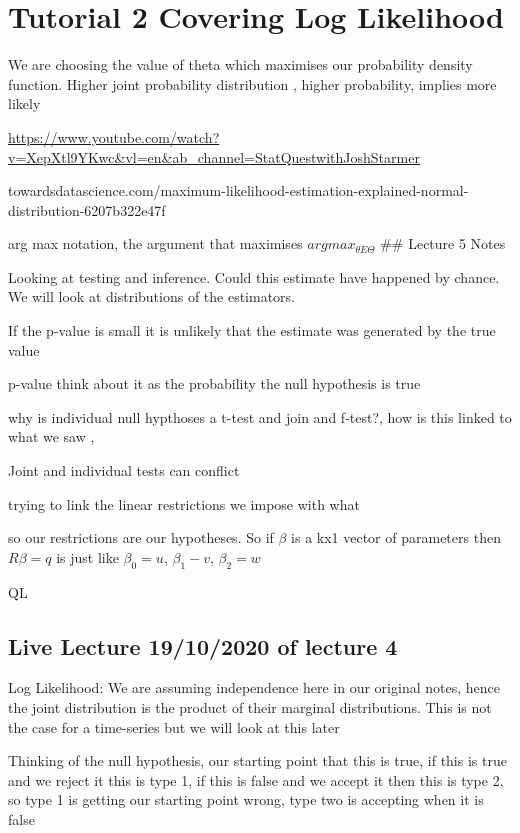 \documentclass[]{article}
\begin{document}
\section{Tutorial 2 Covering Log
Likelihood}\label{tutorial-2-covering-log-likelihood}

We are choosing the value of theta which maximises our probability
density function. Higher joint probability distribution , higher
probability, implies more likely

\url{https://www.youtube.com/watch?v=XepXtl9YKwc\&vl=en\&ab_channel=StatQuestwithJoshStarmer}

towardsdatascience.com/maximum-likelihood-estimation-explained-normal-distribution-6207b322e47f

arg max notation, the argument that maximises
\(arg max_{\theta E \Theta}\) \#\# Lecture 5 Notes

Looking at testing and inference. Could this estimate have happened by
chance. We will look at distributions of the estimators.

If the p-value is small it is unlikely that the estimate was generated
by the true value

p-value think about it as the probability the null hypothesis is true

why is individual null hypthoses a t-test and join and f-test?, how is
this linked to what we saw ,

Joint and individual tests can conflict

trying to link the linear restrictions we impose with what

so our restrictions are our hypotheses. So if \(\beta\) is a kx1 vector
of parameters then \(R\beta = q\) is just like \(\beta_0 = u\),
\(\beta_1 - v\), \(\beta_2 = w\)

QL

\subsection{Live Lecture 19/10/2020 of lecture
4}\label{live-lecture-19102020-of-lecture-4}

Log Likelihood: We are assuming independence here in our original notes,
hence the joint distribution is the product of their marginal
distributions. This is not the case for a time-series but we will look
at this later

Thinking of the null hypothesis, our starting point that this is true,
if this is true and we reject it this is type 1, if this is false and we
accept it then this is type 2, so type 1 is getting our starting point
wrong, type two is accepting when it is false
\end{document}

